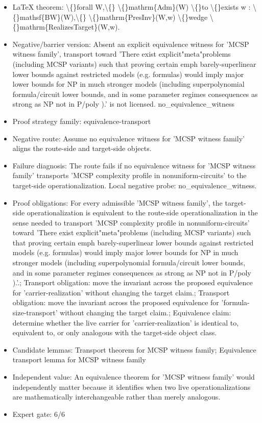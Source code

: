 \documentclass[11pt]{article}
\begin{document}
\begin{itemize}
\item LaTeX theorem: \textbackslash\{\}forall W,\textbackslash\{\} \textbackslash\{\}mathrm\{Adm\}(W) \textbackslash\{\}to \textbackslash\{\}exists w : \textbackslash\{\}mathsf\{BW\}(W),\textbackslash\{\} \textbackslash\{\}mathrm\{PresInv\}(W,w) \textbackslash\{\}wedge \textbackslash\{\}mathrm\{RealizesTarget\}(W,w).
\item Negative/barrier version: Absent an explicit equivalence witness for 'MCSP witness family', transport toward 'There exist explicit"meta"problems (including MCSP variants) such that proving certain emph barely-superlinear lower bounds against restricted models (e.g. formulas) would imply major lower bounds for NP in much stronger models (including superpolynomial formula/circuit lower bounds, and in some parameter regimes consequences as strong as NP not in P/poly ).' is not licensed. no\_equivalence\_witness
\item Proof strategy family: equivalence-transport
\item Negative route: Assume no equivalence witness for 'MCSP witness family' aligns the route-side and target-side objects.
\item Failure diagnosis: The route fails if no equivalence witness for 'MCSP witness family' transports 'MCSP complexity profile in nonuniform-circuits' to the target-side operationalization. Local negative probe: no\_equivalence\_witness.
\item Proof obligations: For every admissible 'MCSP witness family', the target-side operationalization is equivalent to the route-side operationalization in the sense needed to transport 'MCSP complexity profile in nonuniform-circuits' toward 'There exist explicit"meta"problems (including MCSP variants) such that proving certain emph barely-superlinear lower bounds against restricted models (e.g. formulas) would imply major lower bounds for NP in much stronger models (including superpolynomial formula/circuit lower bounds, and in some parameter regimes consequences as strong as NP not in P/poly ).'.; Transport obligation: move the invariant across the proposed equivalence for 'carrier-realization' without changing the target claim.; Transport obligation: move the invariant across the proposed equivalence for 'formula-size-transport' without changing the target claim.; Equivalence claim: determine whether the live carrier for 'carrier-realization' is identical to, equivalent to, or only analogous with the target-side object class.
\item Candidate lemmas: Transport theorem for MCSP witness family; Equivalence transport lemma for MCSP witness family
\item Independent value: An equivalence theorem for 'MCSP witness family' would independently matter because it identifies when two live operationalizations are mathematically interchangeable rather than merely analogous.
\item Expert gate: 6/6
\end{itemize}
\end{document}
